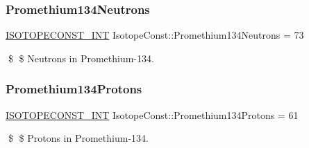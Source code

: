 \subsubsection{\texorpdfstring{Promethium134\+Neutrons}{Promethium134Neutrons}}
{\footnotesize\ttfamily \mbox{\hyperlink{group___isotope_const-_macros_ga5f18360b3e99483a35c32d789e62621c}{I\+S\+O\+T\+O\+P\+E\+C\+O\+N\+S\+T\+\_\+\+I\+NT}} Isotope\+Const\+::\+Promethium134\+Neutrons = 73}

\$ \$ Neutrons in Promethium-\/134. \mbox{\label{group___isotope_const-_promethium-_pm134_ga79a70a2f35795723600788b958fd87d8}} 
\subsubsection{\texorpdfstring{Promethium134\+Protons}{Promethium134Protons}}
{\footnotesize\ttfamily \mbox{\hyperlink{group___isotope_const-_macros_ga5f18360b3e99483a35c32d789e62621c}{I\+S\+O\+T\+O\+P\+E\+C\+O\+N\+S\+T\+\_\+\+I\+NT}} Isotope\+Const\+::\+Promethium134\+Protons = 61}

\$ \$ Protons in Promethium-\/134. 
